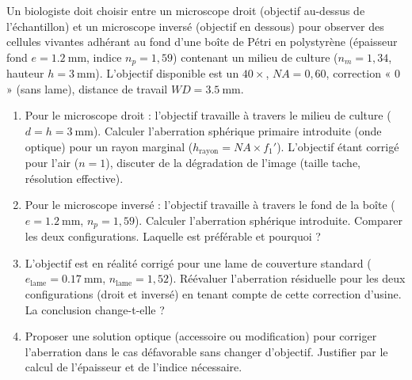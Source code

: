 \documentclass[11pt]{article}
\begin{document}
\begin{exercice}
Un biologiste doit choisir entre un microscope droit (objectif au-dessus de l'échantillon) et un microscope inversé (objectif en dessous) pour observer des cellules vivantes adhérant au fond d'une boîte de Pétri en polystyrène (épaisseur fond $e = \SI{1,2}{\milli\metre}$, indice $n_p = 1,59$) contenant un milieu de culture ($n_m = 1,34$, hauteur $h = \SI{3}{\milli\metre}$). L'objectif disponible est un $40\times$, $NA = 0,60$, correction « 0 » (sans lame), distance de travail $WD = \SI{3,5}{\milli\metre}$.
\begin{enumerate}
    \item Pour le microscope droit : l'objectif travaille à travers le milieu de culture ($d = h = \SI{3}{\milli\metre}$). Calculer l'aberration sphérique primaire introduite (onde optique) pour un rayon marginal ($h_{\text{rayon}} = NA \times f_1'$). L'objectif étant corrigé pour l'air ($n=1$), discuter de la dégradation de l'image (taille tache, résolution effective).
    \item Pour le microscope inversé : l'objectif travaille à travers le fond de la boîte ($e = \SI{1,2}{\milli\metre}$, $n_p=1,59$). Calculer l'aberration sphérique introduite. Comparer les deux configurations. Laquelle est préférable et pourquoi ?
    \item L'objectif est en réalité corrigé pour une lame de couverture standard ($e_{\text{lame}} = \SI{0,17}{\milli\metre}$, $n_{\text{lame}} = 1,52$). Réévaluer l'aberration résiduelle pour les deux configurations (droit et inversé) en tenant compte de cette correction d'usine. La conclusion change-t-elle ?
    \item Proposer une solution optique (accessoire ou modification) pour corriger l'aberration dans le cas défavorable sans changer d'objectif. Justifier par le calcul de l'épaisseur et de l'indice nécessaire.
\end{enumerate}
\end{exercice}
\end{document}
